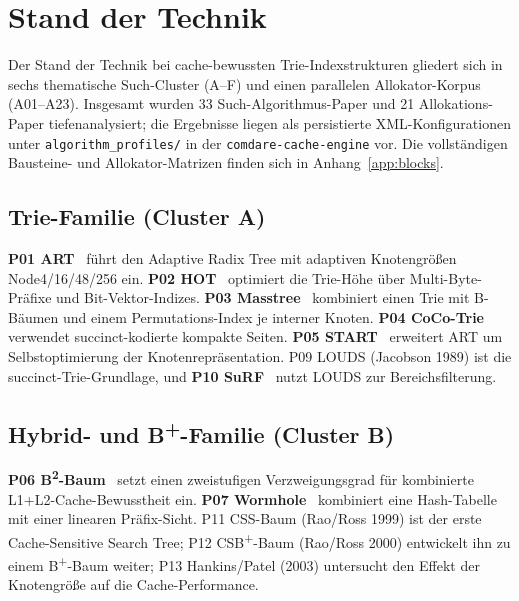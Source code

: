 \chapter{Stand der Technik}\label{ch:sota}

Der Stand der Technik bei cache-bewussten Trie-Indexstrukturen gliedert sich in sechs
thematische Such-Cluster (A--F) und einen parallelen Allokator-Korpus (A01--A23). Insgesamt
wurden 33 Such-Algorithmus-Paper und 21 Allokations-Paper tiefenanalysiert; die Ergebnisse
liegen als persistierte XML-Konfigurationen unter \texttt{algorithm\_profiles/} in der
\texttt{comdare-cache-engine} vor. Die vollständigen Bausteine- und Allokator-Matrizen finden
sich in Anhang~\ref{app:blocks}.

\section{Trie-Familie (Cluster A)}\label{sec:cluster-a}

\textbf{P01 ART}~\cite{leis2013art} führt den Adaptive Radix Tree mit adaptiven Knotengrößen
Node4/16/48/256 ein. \textbf{P02 HOT}~\cite{binna2018hot} optimiert die Trie-Höhe über
Multi-Byte-Präfixe und Bit-Vektor-Indizes. \textbf{P03 Masstree}~\cite{mao2012masstree}
kombiniert einen Trie mit B-Bäumen und einem Permutations-Index je interner Knoten.
\textbf{P04 CoCo-Trie}~\cite{boffa2024coco} verwendet succinct-kodierte kompakte Seiten.
\textbf{P05 START}~\cite{fent2020start} erweitert ART um Selbstoptimierung der
Knotenrepräsentation. P09 LOUDS (Jacobson 1989) ist die succinct-Trie-Grundlage, und
\textbf{P10 SuRF}~\cite{zhang2018surf} nutzt LOUDS zur Bereichsfilterung.

\section{Hybrid- und B\texorpdfstring{\textsuperscript{+}}{+}-Familie (Cluster B)}\label{sec:cluster-b}

\textbf{P06 B\textsuperscript{2}-Baum}~\cite{schmeisser2022b2tree} setzt einen zweistufigen
Verzweigungsgrad für kombinierte L1+L2-Cache-Bewusstheit ein. \textbf{P07
Wormhole}~\cite{wu2019wormhole} kombiniert eine Hash-Tabelle mit einer linearen Präfix-Sicht.
P11 CSS-Baum (Rao/Ross 1999) ist der erste Cache-Sensitive Search Tree; P12
CSB\textsuperscript{+}-Baum (Rao/Ross 2000) entwickelt ihn zu einem B\textsuperscript{+}-Baum
weiter; P13 Hankins/Patel (2003) untersucht den Effekt der Knotengröße auf die
Cache-Performance.

